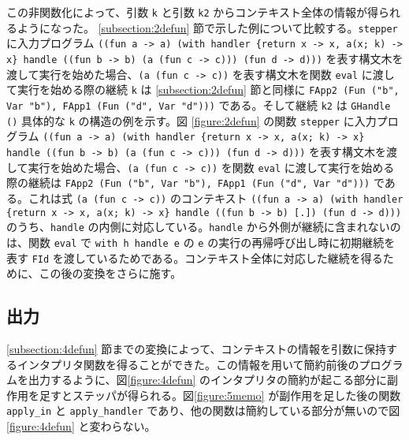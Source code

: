 この非関数化によって、引数 \texttt{k} と引数 \texttt{k2} からコンテキスト全体の情報が得られるようになった。
\ref{subsection:2defun} 節で示した例について比較する。\texttt{stepper} に入力プログラム \texttt{((fun a -> a) (with handler \{return x -> x, a(x; k) -> x\} handle ((fun b -> b) (a (fun c -> c))) (fun d -> d)))} を表す構文木を渡して実行を始めた場合、\texttt{(a (fun c -> c))} を表す構文木を関数 \texttt{eval} に渡して実行を始める際の継続 \texttt{k} は \ref{subsection:2defun} 節と同様に \texttt{{FApp2 (Fun ("b", Var "b"), FApp1 (Fun ("d", Var "d")))}} である。そして継続 \texttt{k2} は \texttt{GHandle ()}
具体的な \texttt{k} の構造の例を示す。図 \ref{figure:2defun} の関数 \texttt{stepper} に入力プログラム \texttt{((fun a -> a) (with handler \{return x -> x, a(x; k) -> x\} handle ((fun b -> b) (a (fun c -> c))) (fun d -> d)))} を表す構文木を渡して実行を始めた場合、\texttt{(a (fun c -> c))} を関数 \texttt{eval} に渡して実行を始める際の継続は \texttt{FApp2 (Fun ("b", Var "b"), FApp1 (Fun ("d", Var "d")))} である。これは式 \texttt{(a (fun c -> c))} のコンテキスト \texttt{((fun a -> a) (with handler \{return x -> x, a(x; k) -> x\} handle ((fun b -> b) [.]) (fun d -> d)))} のうち、\texttt{handle} の内側に対応している。\texttt{handle} から外側が継続に含まれないのは、関数 \texttt{eval} で \texttt{with h handle e} の \texttt{e} の実行の再帰呼び出し時に初期継続を表す \texttt{FId} を渡しているためである。コンテキスト全体に対応した継続を得るために、この後の変換をさらに施す。

\subsection{出力}
\label{subsection:memo}

\ref{subsection:4defun} 節までの変換によって、コンテキストの情報を引数に保持するインタプリタ関数を得ることができた。この情報を用いて簡約前後のプログラムを出力するように、図\ref{figure:4defun} のインタプリタの簡約が起こる部分に副作用を足すとステッパが得られる。図\ref{figure:5memo} が副作用を足した後の関数 \texttt{apply\_in} と \texttt{apply\_handler} であり、他の関数は簡約している部分が無いので図 \ref{figure:4defun} と変わらない。

